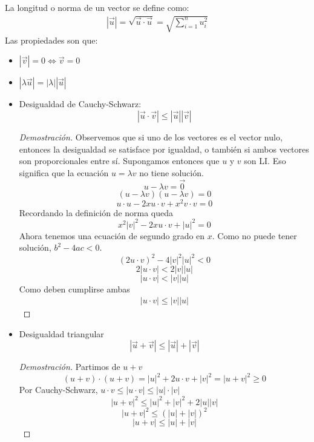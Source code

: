 \documentclass{../Calculo.tex}
\begin{document}
\begin{defin}
	La longitud o norma de un vector se define como:
	\begin{equation}
		\begin{split}
			|\vec{u}| = \sqrt{\vec{u} \cdot \vec{u}} = \sqrt{\sum_{i=1}^{n}
			u_{i}^{2}}
		\end{split}
	\end{equation}
	Las propiedades son que:
	\begin{itemize}
		\item $|\vec{v}| = 0 \iff \vec{v} = 0$
		\item $|\lambda \vec{u}| = |\lambda| |\vec{u}|$
		\item Desigualdad de Cauchy-Schwarz:
			\[
				|\vec{u} \cdot \vec{v}|\leq |\vec{u}||\vec{v}|
			\]
		\begin{proof}[Demostración]
			Observemos que si uno de los vectores es el vector nulo, entonces
			la desigualdad se satisface por igualdad, o también si ambos vectores
			son proporcionales entre sí. Supongamos entonces que $u$ y $v$ son LI.
			Eso significa que la ecuación $u=\lambda v$ no tiene solución.
			\[
				u - \lambda v = \vec{0}
			\]
			\[
				(u-\lambda v)(u-\lambda v) = 0
			\]
			\[
				u \cdot u - 2xu\cdot v+x^{2} v\cdot v=0
			\]
			Recordando la definición de norma queda
			\[
				x^{2}|v|^{2}-2xu\cdot v + |u|^{2}=0
			\]
			Ahora tenemos una ecuación de segundo grado en $x$. Como no puede
			tener solución, $b^{2}-4ac < 0$.
			\[
				(2u\cdot v)^{2} -4|v|^{2}|u|^{2} < 0
			\]
			\[
				2|u\cdot v| < 2|v||u|
			\]
			\[
				|u\cdot v|<|v||u|
			\]
			Como deben cumplirse ambas
			\begin{equation}
				\begin{split}
					|u\cdot v| \leq |v||u|
				\end{split}
			\end{equation}
		\end{proof}
		\item Desigualdad triangular
			\[
				|\vec{u}+\vec{v}| \leq |\vec{u}|+|\vec{v}|
			\]
		\begin{proof}[Demostración]
			Partimos de $u+v$
			\[
				(u+v)\cdot (u+v)=|u|^{2}+2u\cdot v+|v|^{2} = |u+v|^{2} \geq 0
			\]
			Por Cauchy-Schwarz, $u\cdot v\leq|u\cdot v| \leq |u|\cdot |v|$
			\[
				|u+v|^{2} \leq |u|^{2} + |v|^{2} + 2|u||v|
			\]
			\[
				|u+v|^{2} \leq (|u|+|v|)^{2}
			\]
			\[
				|u+v| \leq |u|+|v|
			\]
		\end{proof}
	\end{itemize}
\end{defin}
\end{document}
